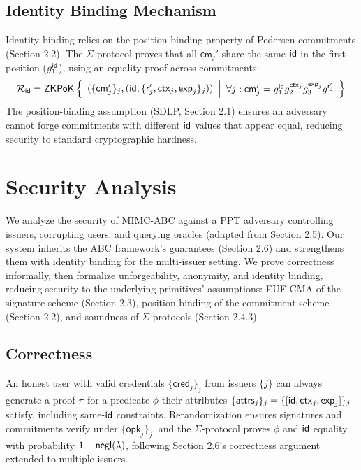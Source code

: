 \subsection{Identity Binding Mechanism}

Identity binding relies on the position-binding property of Pedersen commitments (Section 2.2). The $\Sigma$-protocol proves that all $\mathsf{cm}_j'$ share the same $\mathsf{id}$ in the first position ($g_1^{\mathsf{id}}$), using an equality proof across commitments:
\[
{\mathcal{R}_{\mathsf{id}}} = {\mathsf{ZKPoK}} \left\{ 
\begin{array}{l} 
(\{\mathsf{cm}_j'\}_j, (\mathsf{id}, \{\mathsf{r}_j', \mathsf{ctx}_j, \mathsf{exp}_j\}_j)) \\
\end{array} 
\middle|
\begin{array}{l}
\forall j: \mathsf{cm}_j' = g_1^{\mathsf{id}} g_2^{\mathsf{ctx}_j} g_3^{\mathsf{exp}_j} g^{\mathsf{r}_j'}
\end{array} 
\right\}
\]
The position-binding assumption (SDLP, Section 2.1) ensures an adversary cannot forge commitments with different $\mathsf{id}$ values that appear equal, reducing security to standard cryptographic hardness.






\section{Security Analysis}

We analyze the security of MIMC-ABC against a PPT adversary controlling issuers, corrupting users, and querying oracles (adapted from Section 2.5). Our system inherits the ABC framework’s guarantees (Section 2.6) and strengthens them with identity binding for the multi-issuer setting. We prove correctness informally, then formalize unforgeability, anonymity, and identity binding, reducing security to the underlying primitives’ assumptions: EUF-CMA of the signature scheme (Section 2.3), position-binding of the commitment scheme (Section 2.2), and soundness of $\Sigma$-protocols (Section 2.4.3).

\subsection{Correctness}

An honest user with valid credentials $\{\mathsf{cred}_j\}_j$ from issuers $\{j\}$ can always generate a proof $\pi$ for a predicate $\phi$ their attributes $\{\mathsf{attrs}_j\}_j = \{[\mathsf{id}, \mathsf{ctx}_j, \mathsf{exp}_j]\}_j$ satisfy, including same-$\mathsf{id}$ constraints. Rerandomization ensures signatures and commitments verify under $\{\mathsf{opk}_j\}_j$, and the $\Sigma$-protocol proves $\phi$ and $\mathsf{id}$ equality with probability $1 - \mathsf{negl}(\lambda)$, following Section 2.6’s correctness argument extended to multiple issuers.

